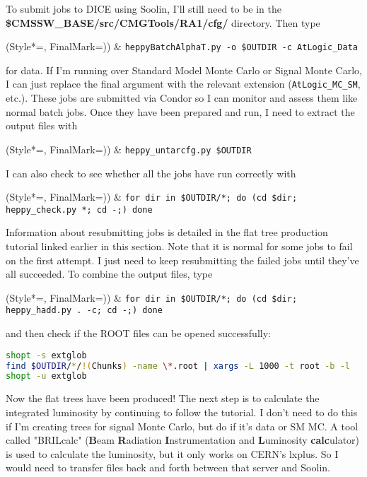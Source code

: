 To submit jobs to DICE using Soolin, I'll still need to be in the \textbf{\$CMSSW\_BASE/src/CMGTools/RA1/cfg/} directory. Then type

\begin{easylist}
\ListProperties(Style*=, FinalMark={)})
& \verb!heppyBatchAlphaT.py -o $OUTDIR -c AtLogic_Data!
\end{easylist}

for data. If I'm running over Standard Model Monte Carlo or Signal Monte Carlo, I can just replace the final argument with the relevant extension (\verb!AtLogic_MC_SM!, etc.). These jobs are submitted via Condor so I can monitor and assess them like normal batch jobs. Once they have been prepared and run, I need to extract the output files with

\begin{easylist}
\ListProperties(Style*=, FinalMark={)})
& \verb!heppy_untarcfg.py $OUTDIR!
\end{easylist}

I can also check to see whether all the jobs have run correctly with

\begin{easylist}
\ListProperties(Style*=, FinalMark={)})
& \texttt{for dir in \$OUTDIR/*; do (cd \$dir; heppy\_check.py *; cd -;) done}
\end{easylist}

Information about resubmitting jobs is detailed in the flat tree production tutorial linked earlier in this section. Note that it is normal for some jobs to fail on the first attempt. I just need to keep resubmitting the failed jobs until they've all succeeded. To combine the output files, type

\begin{easylist}
\ListProperties(Style*=, FinalMark={)})
& \texttt{for dir in \$OUTDIR/*; do (cd \$dir; heppy\_hadd.py . -c; cd -;) done}
\end{easylist}

and then check if the ROOT files can be opened successfully:

\begin{lstlisting}[belowskip=-0.7cm, language=sh, numbers=none]
shopt -s extglob
find $OUTDIR/*/!(Chunks) -name \*.root | xargs -L 1000 -t root -b -l
shopt -u extglob
\end{lstlisting}

Now the flat trees have been produced! The next step is to calculate the integrated luminosity by continuing to follow the tutorial. I don't need to do this if I'm creating trees for signal Monte Carlo, but do if it's data or SM MC. A tool called "BRILcalc" (\textbf{B}eam \textbf{R}adiation \textbf{I}nstrumentation and \textbf{L}uminosity \textbf{calc}ulator) is used to calculate the luminosity, but it only works on CERN's lxplus. So I would need to transfer files back and forth between that server and Soolin.

